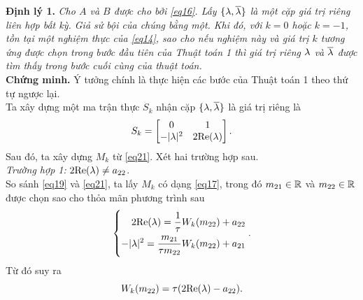 %
\noindent\textbf{Định lý 1.} \textit{Cho $A$ và $B$ được cho bởi \eqref{eq16}. Lấy $\{ \lambda, \overline{\lambda}\}$ là một cặp giá trị riêng liên hợp bất kỳ. Giả sử bội của chúng bằng một. Khi đó, với $k =0$ hoặc $k =-1$, tồn tại một nghiệm thực của \eqref{eq14}, sao cho nếu nghiệm này và giá trị $k$ tương ứng được chọn trong bước đầu tiên của Thuật toán 1 thì giá trị riêng $\lambda$ và $\overline{\lambda}$ được tìm thấy trong bước cuối cùng của thuật toán. }\\
%
\noindent\textbf{Chứng minh.} Ý tưởng chính là thực hiện các bước của Thuật toán 1 theo thứ tự ngược lại.\\
Ta xây dựng một ma trận thực $S_k$ nhận cặp  $\{ \lambda, \overline{\lambda}\}$ là giá trị riêng là
\begin{equation}\label{eq21}
	S_k = \begin{bmatrix}
		0 &1\\
		-\vert \lambda \vert ^2 & 2 \mathrm{Re}(\lambda)
	\end{bmatrix}.
\end{equation}
Sau đó, ta xây dựng $M_k$ từ \eqref{eq21}. Xét hai trường hợp sau.\\
\noindent\textit{Trường hợp 1:} $2\mathrm{Re}(\lambda) \ne a_{22}$.\\
So sánh \eqref{eq19} và \eqref{eq21}, ta lấy $M_k$ có dạng \eqref{eq17}, trong đó $m_{21} \in \mathbb{R}$ và $m_{22} \in \mathbb{R}$ được chọn sao cho thỏa mãn phương trình sau
\begin{equation*}
	\left\{\begin{aligned}2\mathrm{Re}(\lambda) = \dfrac{1}{\tau} W_k(m_{22}) +a_{22} \\ -\vert \lambda\vert ^2 = \dfrac{m_{21}}{\tau m_{22}} W_k(m_{22}) + a_{21}\end{aligned}\right..
\end{equation*}
Từ đó suy ra
\begin{equation}\label{eq22}
	W_k(m_{22}) = \tau(2\mathrm{Re}(\lambda) - a_{22}).
\end{equation}

